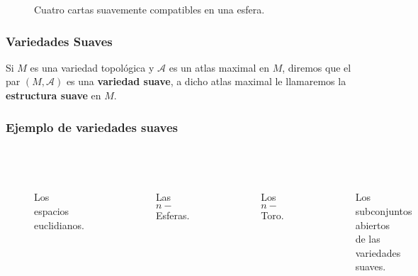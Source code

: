 \begin{frame}
	\centering
	\begin{figure}
		
		\caption{Cuatro cartas suavemente compatibles en una esfera.}
	\end{figure}
\end{frame}

\begin{frame}
	\frametitle{Variedades Suaves}
	\begin{definition}
		Si $M$ es una variedad topológica y $\mathcal{A}$ es un atlas maximal en $M$, diremos que el par $(M,\mathcal{A})$ es una \textbf{variedad suave}, a dicho atlas maximal le llamaremos la \textbf{estructura suave} en $M$.
	\end{definition}
\end{frame}

\begin{frame}
	\frametitle{Ejemplo de variedades suaves}
	\begin{columns}[t]
		\centering
		\begin{figure}
			\scalebox{.5}{}\\
			\caption{Los espacios euclidianos.}
		\end{figure}
		\begin{figure}
			\scalebox{.5}{}\\
			\caption{Las $n-$Esferas.}
		\end{figure}
		\centering
		\begin{figure}
			\vspace{12pt}
			\scalebox{.45}{}\\
			\caption{Los $n-$Toro.}
		\end{figure}
		\begin{figure}
			\vspace{-6pt}
			\centering
			\scalebox{.55}{}\\
			\caption{Los subconjuntos abiertos\\ de las variedades suaves.}
		\end{figure}
	\end{columns}
\end{frame}

